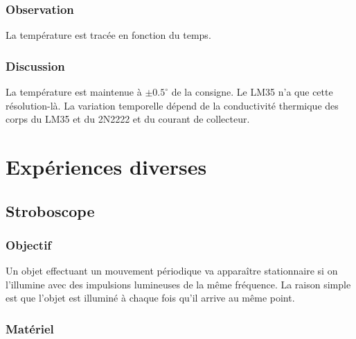 \documentclass{book}
\begin{document}
\subsection{Observation}


La température est tracée en fonction du temps.

\subsection{Discussion}


La température est maintenue à $\pm 0.5^{\circ}$ de la consigne. Le LM35 n'a que cette résolution-là. La variation temporelle dépend de la conductivité thermique des corps du LM35 et du 2N2222 et du courant de collecteur.







\chapter{Expériences diverses}









\section{Stroboscope}



\subsection{Objectif}


Un objet effectuant un mouvement périodique va apparaître stationnaire si on l'illumine avec des impulsions lumineuses de la même fréquence. La raison simple est que l'objet est illuminé à chaque fois qu'il arrive au même point.




\subsection{Matériel}
\end{document}

